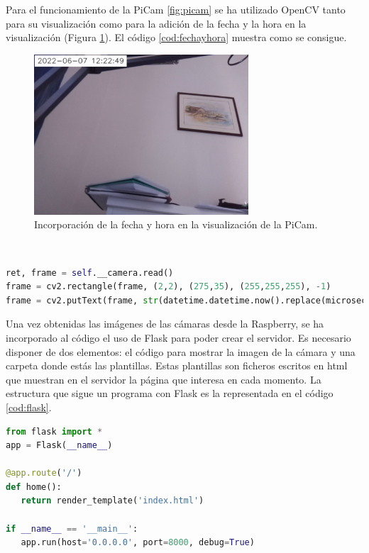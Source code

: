 Para el funcionamiento de la PiCam \ref{fig:picam} se ha utilizado OpenCV tanto para su visualización como para la adición de la fecha y la hora en la visualización (Figura \ref{fig:fechayhora}). El código \ref{cod:fechayhora} muestra como se consigue.
\begin{figure} [h!]
  \begin{center}
    \includegraphics[width=8cm]{figs/fechayhora}
  \end{center}
  \caption{Incorporación de la fecha y hora en la visualización de la PiCam.}
  \label{fig:fechayhora}
\end{figure}\\

\begin{code}[h]
\begin{lstlisting}[language=Python]
ret, frame = self.__camera.read()
frame = cv2.rectangle(frame, (2,2), (275,35), (255,255,255), -1)
frame = cv2.putText(frame, str(datetime.datetime.now().replace(microsecond=0)), (10,25), cv2.FONT_HERSEY_SIMPLEX, 0.7, (0,0,0), 1, cv2.LINE_AA))
\end{lstlisting}
\caption[Código para incorporar la fecha en la esquina superior izquierda.]{Código para incorporar la fecha en la esquina superior izquierda.}
\label{cod:fechayhora}
\end{code}

Una vez obtenidas las imágenes de las cámaras desde la Raspberry, se ha incorporado al código el uso de Flask para poder crear el servidor. Es necesario disponer de dos elementos: el código para mostrar la imagen de la cámara y una carpeta donde estás las plantillas. Estas plantillas son ficheros escritos en html que muestran en el servidor la página que interesa en cada momento. La estructura que sigue un programa con Flask es la representada en el código \ref{cod:flask}.
\begin{code}[h]
\begin{lstlisting}[language=Python]
from flask import *
app = Flask(__name__)

@app.route('/')
def home():
   return render_template('index.html')

if __name__ == '__main__':
   app.run(host='0.0.0.0', port=8000, debug=True)
\end{lstlisting}
\caption[Código simple que crea un servidor web en el puerto 8000 y muestra el contenido de index.html.]{Código simple que crea un servidor web y muestra el contenido de index.html.}
\label{cod:flask}
\end{code}

